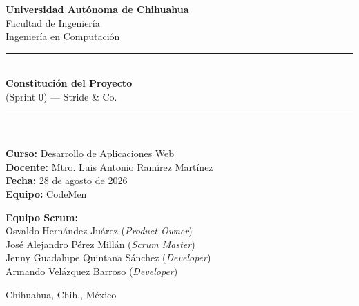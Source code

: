 \documentclass[12pt, a4paper]{article}
\begin{document}
\begin{titlepage}
    \centering

    {\Large\bfseries Universidad Autónoma de Chihuahua}\\[0.3cm]
    {\large Facultad de Ingeniería}\\[0.2cm]
    {\large Ingeniería en Computación}\\[1.5cm]

    \rule{\linewidth}{1.5pt}\\[0.4cm]
    {\huge\bfseries Constitución del Proyecto}\\[0.2cm]
    {\LARGE (Sprint 0) --- Stride \& Co.}\\[0.4cm]
    \rule{\linewidth}{1.5pt}\\[1.5cm]

    \begin{minipage}{0.48\textwidth}
        \begin{flushleft} \large
            \textbf{Curso:} Desarrollo de Aplicaciones Web\\
            \textbf{Docente:} Mtro. Luis Antonio Ramírez Martínez\\
            \textbf{Fecha:} 28 de agosto de 2026\\
            \textbf{Equipo:} CodeMen
        \end{flushleft}
    \end{minipage}
    \hfill
    \begin{minipage}{0.48\textwidth}
        \begin{flushright} \large
            \textbf{Equipo Scrum:}\\
            Osvaldo Hernández Juárez (\textit{Product Owner})\\
            José Alejandro Pérez Millán (\textit{Scrum Master})\\
            Jenny Guadalupe Quintana Sánchez (\textit{Developer})\\
            Armando Velázquez Barroso (\textit{Developer})
        \end{flushright}
    \end{minipage}

    \vfill
    {\small Chihuahua, Chih., México}
\end{titlepage}

\newpage
\tableofcontents
\newpage
\end{document}
